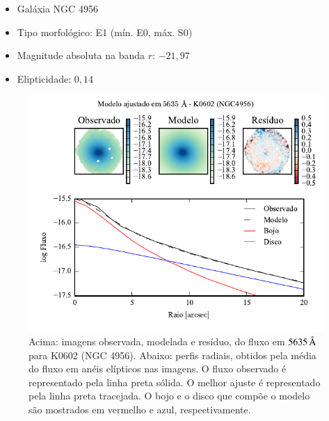 \begin{itemize}
  \item Galáxia NGC 4956
  \item Tipo morfológico: E1 (mín. E0, máx. S0)
  \item Magnitude absoluta na banda $r$: $-21,97$
  \item Elipticidade: $0,14$
\end{itemize}

\begin{figure}
	\includegraphics[page=1]{figuras-decomp/K0602_sample006a}
	\caption[Ajuste morfológico em $5635\,\angstrom$ de K0602 (NGC 4956)]
	{Acima: imagens observada, modelada e resíduo, do fluxo em $5635\,\angstrom$
	para K0602 (NGC 4956). Abaixo: perfis radiais, obtidos pela média do fluxo em
	anéis elípticos nas imagens. O fluxo observado é representado pela linha preta
	sólida. O melhor ajuste é representado pela linha preta tracejada. O bojo e o
	disco que compõe o modelo são mostrados em vermelho e azul, respectivamente.}
	\label{fig:decompRadprof:K0602}
\end{figure}

